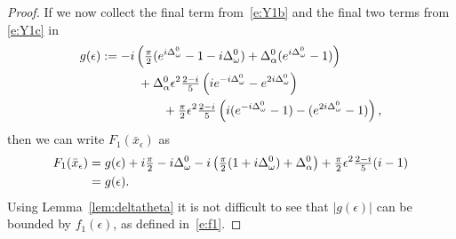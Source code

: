 \begin{proof}
If we now collect the final term from~\eqref{e:Y1b} and the final two terms from \eqref{e:Y1c}
in 
\begin{alignat*}{1}
g(\epsilon) &:=
-i \left( \tfrac{\pi}{2}  (e^{i \Delta_\omega^0 }-1- i \Delta_\omega^0) + \Delta_\alpha^0  (e^{i \Delta_\omega^0 }-1)\right) \\
& \quad\qquad +
\Delta_\alpha^0 \epsilon^2 \tfrac{2-i}{5} \left(i e^{- i \Delta_\omega^0} - e^{2 i \Delta_\omega^0}\right) \\
& \quad\qquad\qquad+
\tfrac{\pi}{2} \epsilon^2 \tfrac{2-i}{5} \left(i (e^{- i \Delta_\omega^0} -1)-(e^{2 i \Delta_\omega^0}-1)\right) ,
\end{alignat*}
then we can write $F_1(\bar{x}_\epsilon)$ as 
\begin{alignat*}{1}
F_1(\bar{x}_\epsilon) &= g(\epsilon) 
+ i \tfrac{\pi}{2} -  i \Delta_\omega^0  
-i \left(\tfrac{\pi}{2}  (1 + i \Delta_\omega^0 )   + \Delta_\alpha^0  \right)
+ \tfrac{\pi}{2} \epsilon^2 \tfrac{2-i}{5} (i  - 1) \\
&= g(\epsilon).
\end{alignat*}
Using Lemma~\ref{lem:deltatheta} it  is not difficult to see that $|g(\epsilon)|$ can be bounded by $f_1(\epsilon)$, as defined in~\eqref{e:f1}.
%
\end{proof}


